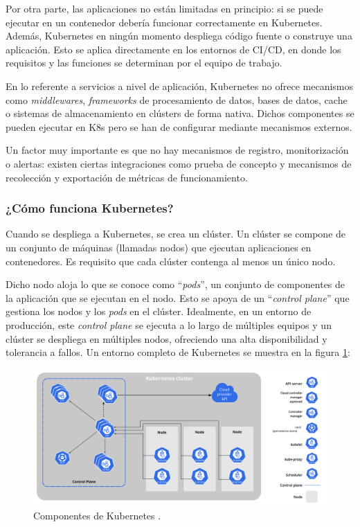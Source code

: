 Por otra parte, las aplicaciones no están limitadas en principio: si se puede
ejecutar en un contenedor debería funcionar correctamente en Kubernetes. Además,
Kubernetes en ningún momento despliega código fuente o construye una aplicación.
Esto se aplica directamente en los entornos de CI/CD, en donde los requisitos y
las funciones se determinan por el equipo de trabajo.

En lo referente a servicios a nivel de aplicación, Kubernetes no ofrece mecanismos
como \textit{middlewares}, \textit{frameworks} de procesamiento de datos, 
bases de datos, cache o sistemas de almacenamiento en clústers de forma nativa.
Dichos componentes se pueden ejecutar en K8s pero se han de configurar mediante
mecanismos externos.

Un factor muy importante es que no hay mecanismos de registro, monitorización o
alertas: existen ciertas integraciones como prueba de concepto y mecanismos de
recolección y exportación de métricas de funcionamiento.

\subsubsection*{¿Cómo funciona Kubernetes?}
Cuando se despliega a Kubernetes, se crea un clúster. Un clúster se compone de un
conjunto de máquinas (llamadas nodos) que ejecutan aplicaciones en contenedores.
Es requisito que cada clúster contenga al menos un único nodo.

Dicho nodo aloja lo que se conoce como ``\textit{pods}'', un conjunto de componentes
de la aplicación que se ejecutan en el nodo. Esto se apoya de un ``\textit{control plane}''
que gestiona los nodos y los \textit*{pods} en el clúster. Idealmente, en un
entorno de producción, este \textit{control plane} se ejecuta a lo largo de
múltiples equipos y un clúster se despliega en múltiples nodos, ofreciendo una
alta disponibilidad y tolerancia a fallos. Un entorno completo de Kubernetes
se muestra en la figura \ref{fig:k8s-cluster}:

\begin{figure}[H]
    \centering
    \includegraphics[width=\linewidth]{pictures/components-of-kubernetes.png}
    \caption{Componentes de Kubernetes \autocite{KubernetesComponents}.}
    \label{fig:k8s-cluster}
\end{figure}

